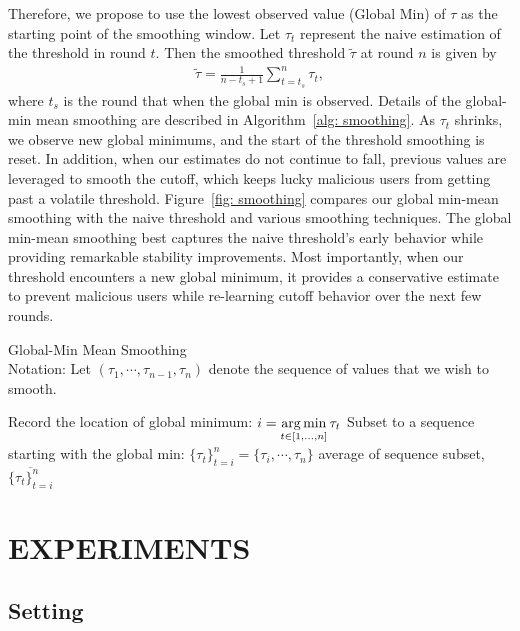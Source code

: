 \documentclass{article} %
\begin{document}
Therefore, we propose to use the lowest observed value (Global Min) of $\tau$ as the starting point of the smoothing window. Let $\tau_t$ represent the naive estimation of the threshold in round $t$. Then the smoothed threshold $\tilde{\tau}$ at round $n$ is given by
\begin{align*}
    \tilde{\tau} = \frac{1}{n-t_s+1}\sum_{t=t_s}^n \tau_t,
\end{align*}
where $t_s$ is the round that when the global min is observed. Details of the global-min mean smoothing are described in Algorithm~\ref{alg: smoothing}. As $\tau_t$ shrinks, we observe new global minimums, and the start of the threshold smoothing is reset.  In addition, when our estimates do not continue to fall, previous values are leveraged to smooth the cutoff, which keeps lucky malicious users from getting past a volatile threshold. Figure~\ref{fig: smoothing} compares our global min-mean smoothing with the naive threshold and various smoothing techniques. The global min-mean smoothing best captures the naive threshold's early behavior while providing remarkable stability improvements. Most importantly, when our threshold encounters a new global minimum, it provides a conservative estimate to prevent malicious users while re-learning cutoff behavior over the next few rounds.

\begin{algorithm}[H]
\caption{Global-Min Mean Smoothing \\ 
Notation: Let $(\tau_1, \cdots, \tau_{n - 1}, \tau_n)$ denote the sequence of values that we wish to smooth.
}
\label{alg: smoothing}
\begin{algorithmic}[1]

        \State Record the location of global minimum: $i = \operatorname*{arg\,min}\limits_{t \in [1,...,n] } \tau_t$
        \State Subset to a sequence starting with the global min: $\{\tau_t\}_{t=i}^n = \{\tau_i, \cdots, \tau_n \}$
        \State \Return average of sequence subset, $\overline{\{\tau_t\}_{t=i}^n}$
    \EndProcedure
\end{algorithmic}
\end{algorithm}

\vspace{-5pt}
\section{EXPERIMENTS}

\subsection{Setting}
\end{document}
